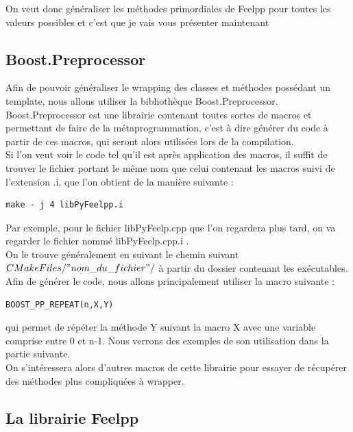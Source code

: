 \documentclass[french,12pt]{article}
\begin{document}
On veut donc généraliser les méthodes primordiales de Feelpp pour toutes les valeurs possibles et c'est que je vais vous présenter maintenant

\subsection{Boost.Preprocessor}

Afin de pouvoir généraliser le wrapping des classes et méthodes possédant un template, nous allons utiliser la bibliothèque Boost.Preprocessor.\\

Boost.Preprocessor est une librairie contenant toutes sortes de macros et permettant de faire de la métaprogrammation, c'est à dire générer du code à partir de ces macros, qui seront alors utilisées lors de la compilation.\\

Si l'on veut voir le code tel qu'il est après application des macros, il suffit de trouver le fichier portant le même nom que celui contenant les macros suivi de l'extension .i, que l'on obtient de la manière suivante : 
\begin{lstlisting}
make - j 4 libPyFeelpp.i
\end{lstlisting}

Par exemple, pour le fichier libPyFeelp.cpp que l'on regardera plus tard, on va regarder le fichier nommé libPyFeelp.cpp.i  .\\
On le trouve généralement en suivant le chemin suivant $CMakeFiles/"nom\_du\_fichier"/$ à partir du dossier contenant les exécutables.\\

Afin de générer le code, nous allons principalement utiliser la macro suivante :
\begin{lstlisting}
BOOST_PP_REPEAT(n,X,Y)
\end{lstlisting}
qui permet de répéter la méthode Y suivant la macro X avec une variable comprise entre 0 et n-1. Nous verrons des exemples de son utilisation dans la partie suivante.\\

On s'intéressera alors d'autres macros de cette librairie pour essayer de récupérer des méthodes plus compliquées à wrapper.

\subsection{La librairie Feelpp}
\end{document}
